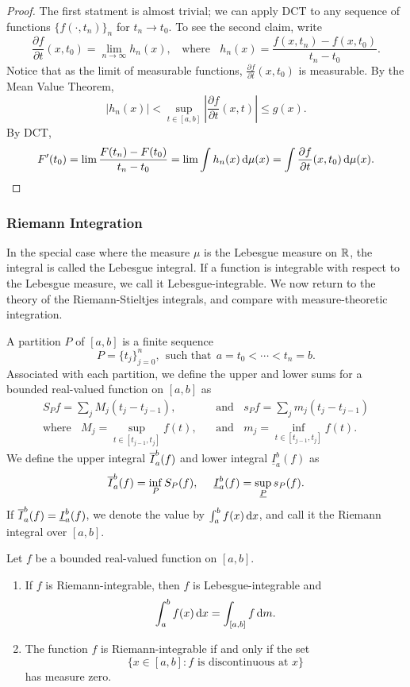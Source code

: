 \documentclass[12pt]{article} %
\begin{document}
\begin{proof}
    The first statment is almost trivial; we can apply DCT to any sequence of functions $\{f(\cdot, t_n)\}_n$ for $t_n \to t_0$. To see the second claim, write \[\frac{\partial f}{\partial t}(x, t_0) = \lim_{n \to \infty} h_n(x), \ \ \ \ \text{where} \ \ \ \ h_n(x) = \frac{f(x, t_n) - f(x, t_0)}{t_n - t_0}.\] Notice that as the limit of measurable functions, $\frac{\partial f}{\partial t}(x, t_0)$ is measurable. By the Mean Value Theorem, \[|h_n(x)| < \sup_{t \in [a,b]} \left|\frac{\partial f}{\partial t} (x, t) \right| \leq g(x).\] By DCT, \[F'(t_0) = \lim \frac{F(t_n) - F(t_0)}{t_n - t_0} = \lim \int h_n(x) \, \mathrm{d} \mu(x) = \int \frac{\partial f}{\partial t} (x, t_0) \, \mathrm{d} \mu(x).\]
\end{proof}

\subsubsection{Riemann Integration}

In the special case where the measure $\mu$ is the Lebesgue measure on $\mathbb{R}$, the integral is called the Lebesgue integral. If a function is integrable with respect to the Lebesgue measure, we call it Lebesgue-integrable. We now return to the theory of the Riemann-Stieltjes integrals, and compare with measure-theoretic integration.

\begin{definition}
    A partition $P$ of $[a, b]$ is a finite sequence \[P = \{t_j\}_{j=0}^{n}, \ \ \text{such that} \ \ a =t_0 < \cdots < t_n = b.\] Associated with each partition, we define the upper and lower sums for a bounded real-valued function on $[a, b]$ as \begin{align*}
        S_{P}f = \sum_j M_j(t_j - t_{j-1}), \ \ \ \ &\text{and} \ \ \ \ s_{P}f = \sum_j m_j (t_j - t_{j-1})\\
        \text{where} \ \ \ \ M_j = \sup_{t \in [t_{j-1}, t_j]}f(t), \ \ \ \ &\text{and} \ \ \ \ m_j = \inf_{t \in [t_{j-1}, t_j]}f(t).
    \end{align*} We define the upper integral $\overline{I}_a^b(f)$ and lower integral $\underline{I}_a^b(f)$ as \[\ol{I}_a^b(f) = \inf_{P} S_P (f), \ \ \ \ \underline{I}_a^b(f) = \sup_{\underline{P}}s_P(f).\] If $\overline{I}_a^b(f) = \underline{I}_a^b(f)$, we denote the value by $\int_a^b f(x) \, \mathrm{d} x$, and call it the Riemann integral over $[a, b]$.
\end{definition}

\begin{theorem}
    Let $f$ be a bounded real-valued function on $[a, b]$. \begin{enumerate}
        \item If $f$ is Riemann-integrable, then $f$ is Lebesgue-integrable and \[\int_a^b f(x) \, \mathrm{d} x = \int_{[a, b]} f \, \mathrm{d} m.\]
        \item The function $f$ is Riemann-integrable if and only if the set \[\{x \in [a, b] : \text{$f$ is discontinuous at $x$}\}\] has measure zero.
    \end{enumerate}
\end{theorem}
\end{document}
